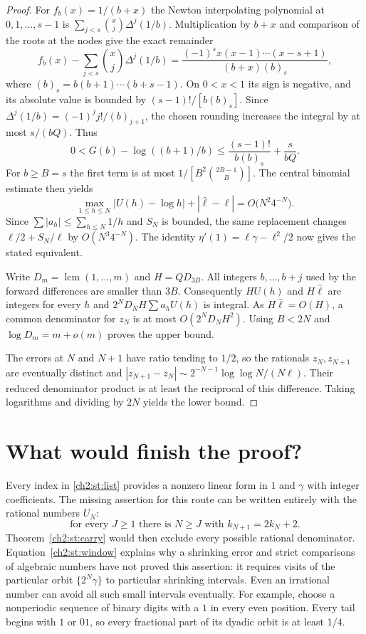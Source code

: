 \documentclass[11pt,a4paper,oneside,openany]{report}
\theoremstyle{remark}\newtheorem{remark}[theorem]{Remark}
\numberwithin{equation}{section}
\begin{document}
\begin{proof}
For $f_b(x)=1/(b+x)$ the Newton interpolating polynomial at
$0,1,\ldots,s-1$ is $\sum_{j<s}\binom{x}{j}\Delta^j(1/b)$.
Multiplication by $b+x$ and comparison of the roots at the nodes
give the exact remainder
\[
 f_b(x)-\sum_{j<s}\binom{x}{j}\Delta^j(1/b)
   =\frac{(-1)^s x(x-1)\cdots(x-s+1)}{(b+x)(b)_s},
\]
where $(b)_s=b(b+1)\cdots(b+s-1)$. On $0<x<1$ its sign is negative,
and its absolute value is bounded by $(s-1)!/[b(b)_s]$.
Since $\Delta^j(1/b)=(-1)^j j!/(b)_{j+1}$, the chosen rounding
increases the integral by at most $s/(bQ)$. Thus
\[
 0<G(b)-\log((b+1)/b)
 \le \frac{(s-1)!}{b(b)_s}+\frac{s}{bQ}.
\]
For $b\ge B=s$ the first term is at most
$1/[B^2\binom{2B-1}{B}]$. The central binomial estimate then yields
\[
 \max_{1\le h\le N}|U(h)-\log h|
      +|\widehat\ell-\ell|=O\bigl(N^2 4^{-N}\bigr).
\]
Since $\sum|a_h|\le\sum_{h\le N}1/h$ and $S_N$ is bounded, the same
replacement changes $\ell/2+S_N/\ell$ by $O(N^3 4^{-N})$.
The identity $\eta'(1)=\ell\gamma-\ell^2/2$ now gives the stated
equivalent.

Write $D_m=\operatorname{lcm}(1,\ldots,m)$ and $H=Q D_{3B}$.
All integers $b,\ldots,b+j$ used by the forward differences are
smaller than $3B$. Consequently $HU(h)$ and $H\widehat\ell$ are
integers for every $h$ and $2^ND_NH\sum a_hU(h)$ is integral.
As $H\widehat\ell=O(H)$, a common denominator for $z_N$ is at most
$O(2^ND_NH^2)$. Using $B<2N$ and $\log D_m=m+o(m)$ proves the
upper bound.

The errors at $N$ and $N+1$ have ratio tending to $1/2$, so the
rationals $z_N,z_{N+1}$ are eventually distinct and
$|z_{N+1}-z_N|\sim 2^{-N-1}\log\log N/(N\ell)$. Their reduced
denominator product is at least the reciprocal of this difference.
Taking logarithms and dividing by $2N$ yields the lower bound.
\end{proof}
\section{What would finish the proof?}
Every index in \eqref{ch2:st:list} provides a nonzero linear form in $1$ and $\gamma$ with integer coefficients. The missing assertion for this route can be written entirely with the rational numbers $U_N$:
\[
 \text{for every }J\ge1\text{ there is }N\ge J
 \text{ with }k_{N+1}=2k_N+2 .
\]
Theorem~\ref{ch2:st:carry} would then exclude every possible rational denominator. Equation~\eqref{ch2:st:window} explains why a shrinking error and strict comparisons of algebraic numbers have not proved this assertion: it requires visits of the particular orbit $\{2^N\gamma\}$ to particular shrinking intervals. Even an irrational number can avoid all such small intervals eventually. For example, choose a nonperiodic sequence of binary digits with a $1$ in every even position. Every tail begins with $1$ or $01$, so every fractional part of its dyadic orbit is at least $1/4$.
\end{document}
